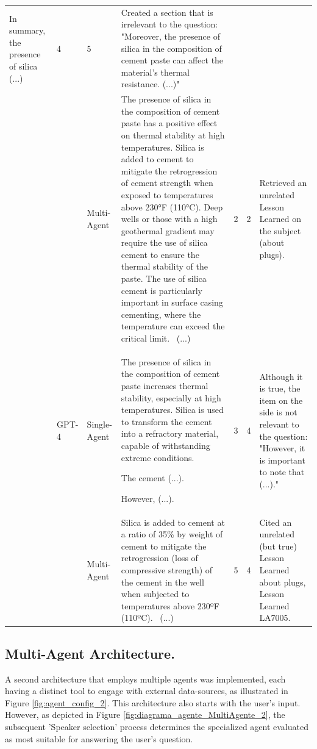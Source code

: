 \begin{landscape}
\begin{table}[h]
\begin{tabular}{| m{3cm} | m{1.5cm} | m{1.5cm} |>{\scriptsize}m{9cm} | m{1.3cm} | m{1.2cm} |>{\scriptsize}m{4cm} |}
                    In summary, the presence of silica (...) & 4 & 5 & Created a section that is irrelevant to the question: "Moreover, the presence of silica in the composition of cement paste can affect the material's thermal resistance. (...)" \\
                    \cline{3-7}
                    &  & Multi-Agent & The presence of silica in the composition of cement paste has a positive effect on thermal stability at high temperatures. Silica is added to cement to mitigate the retrogression of cement strength when exposed to temperatures above 230°F (110°C). Deep wells or those with a high geothermal gradient may require the use of silica cement to ensure the thermal stability of the paste. The use of silica cement is particularly important in surface casing cementing, where the temperature can exceed the critical limit. \ (...) & 2 & 2 & Retrieved an unrelated Lesson Learned on the subject (about plugs). \\ 
                    \cline{2-7}
                    & GPT-4 & Single-Agent & The presence of silica in the composition of cement paste increases thermal stability, especially at high temperatures. Silica is used to transform the cement into a refractory material, capable of withstanding extreme conditions. 
                    
                    The cement (...).

                    However, (...). & 3 & 4 & Although it is true, the item on the side is not relevant to the question: "However, it is important to note that (...)." \\
                    \cline{3-7}
                    &  & Multi-Agent & Silica is added to cement at a ratio of 35\% by weight of cement to mitigate the retrogression (loss of compressive strength) of the cement in the well when subjected to temperatures above 230ºF (110ºC). \ (...) & 5 & 4 & Cited an unrelated (but true) Lesson Learned about plugs, Lesson Learned LA7005. \\
                    \hline
                    \end{tabular}
                \end{table}
            \end{landscape}
            
            

        \subsection{Multi-Agent Architecture.}             
            A second architecture that employs multiple agents was implemented, each having a distinct tool to engage with external data-sources, as illustrated in Figure \ref{fig:agent_config_2}. 
            This architecture also starts with the user’s input. However, as depicted in Figure \ref{fig:diagrama_agente_MultiAgente_2},  the subsequent 'Speaker selection' process determines the specialized agent evaluated as most suitable for answering the user's question.
            

